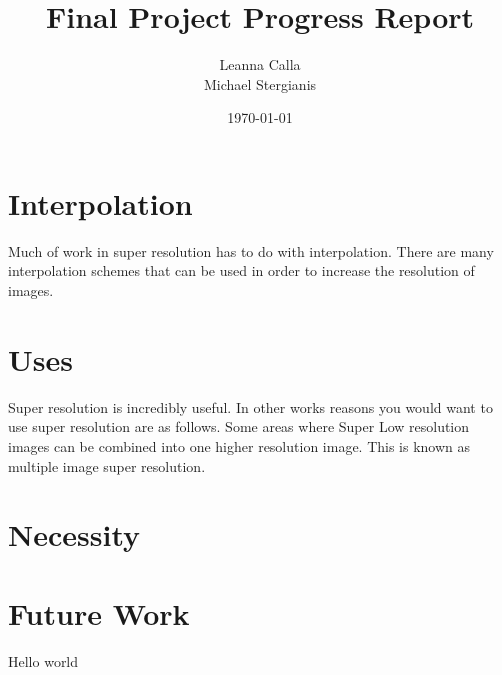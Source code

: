 \documentclass{article}
\title{Final Project Progress Report}
\author{Leanna Calla\\Michael Stergianis}
\date{\today}
\begin{document}
\maketitle
\section{Interpolation}
\label{sec:interpolation}
Much of work in super resolution has to do with interpolation.  There
are many interpolation schemes that can be used in order to increase
the resolution of images.
%
%
\section{Uses}
\label{sec:uses}
Super resolution is incredibly useful. In other works \cite{Yang2010ImageSH} reasons you
would want to use super resolution are as follows. Some areas where
Super 
%
Low resolution images can be combined into one higher resolution
image. This is known as multiple image super resolution.
%
%
\section{Necessity}
\label{sec:necessity}
%
%
\section{Future Work}
\label{sec:future}
Hello world
%
\printbibliography
\end{document}
